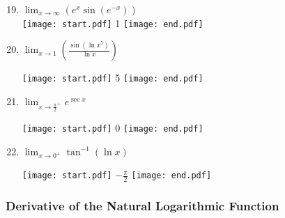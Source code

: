 \documentclass[12pt]{article}
\begin{document}

\begin{enumerate}
\setcounter{enumi}{18}

\item $\displaystyle \lim_{x\rightarrow \infty}{\left(e^x \sin {(e^{-x})}\right)}$\\

\texttt{[image: start.pdf]}
{{1}}
\texttt{[image: end.pdf]}


\item $\displaystyle \lim_{x\rightarrow 1}{\left(\frac{\sin{(\ln x^5)}}{\ln x}\right)}$ 

\texttt{[image: start.pdf]}
{{5}}
\texttt{[image: end.pdf]}


\item $\displaystyle \lim_{x \rightarrow \frac{\pi}{2}^+}{e^{\sec{x}}}$

\texttt{[image: start.pdf]}
{{0}}
\texttt{[image: end.pdf]}


\item $\displaystyle \lim_{x \rightarrow 0^+}{\tan^{-1}{(\ln{x})}}$

\texttt{[image: start.pdf]}
{{$\displaystyle -\frac{\pi}{2}$}}
\texttt{[image: end.pdf]}


\end{enumerate}

\subsubsection*{Derivative of the Natural Logarithmic Function}

\end{document}
